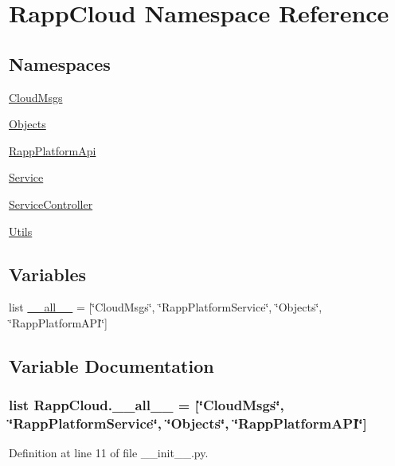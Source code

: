 \hypertarget{namespaceRappCloud}{\section{Rapp\-Cloud Namespace Reference}
\label{namespaceRappCloud}
}
\subsection*{Namespaces}
\begin{DoxyCompactItemize}
\item 
\hyperlink{namespaceRappCloud_1_1CloudMsgs}{Cloud\-Msgs}
\item 
\hyperlink{namespaceRappCloud_1_1Objects}{Objects}
\item 
\hyperlink{namespaceRappCloud_1_1RappPlatformApi}{Rapp\-Platform\-Api}
\item 
\hyperlink{namespaceRappCloud_1_1Service}{Service}
\item 
\hyperlink{namespaceRappCloud_1_1ServiceController}{Service\-Controller}
\item 
\hyperlink{namespaceRappCloud_1_1Utils}{Utils}
\end{DoxyCompactItemize}
\subsection*{Variables}
\begin{DoxyCompactItemize}
\item 
list \hyperlink{namespaceRappCloud_af4935f359058c9fbf897a1a7924b1af4}{\-\_\-\-\_\-all\-\_\-\-\_\-} = \mbox{[}\char`\"{}Cloud\-Msgs\char`\"{}, \char`\"{}Rapp\-Platform\-Service\char`\"{}, \char`\"{}Objects\char`\"{}, \char`\"{}Rapp\-Platform\-A\-P\-I\char`\"{}\mbox{]}
\end{DoxyCompactItemize}


\subsection{Variable Documentation}
\hypertarget{namespaceRappCloud_af4935f359058c9fbf897a1a7924b1af4}{
\subsubsection[{\-\_\-\-\_\-all\-\_\-\-\_\-}]{\setlength{\rightskip}{0pt plus 5cm}list Rapp\-Cloud.\-\_\-\-\_\-all\-\_\-\-\_\- = \mbox{[}\char`\"{}Cloud\-Msgs\char`\"{}, \char`\"{}Rapp\-Platform\-Service\char`\"{}, \char`\"{}Objects\char`\"{}, \char`\"{}Rapp\-Platform\-A\-P\-I\char`\"{}\mbox{]}}}\label{namespaceRappCloud_af4935f359058c9fbf897a1a7924b1af4}


Definition at line 11 of file \-\_\-\-\_\-init\-\_\-\-\_\-.\-py.

